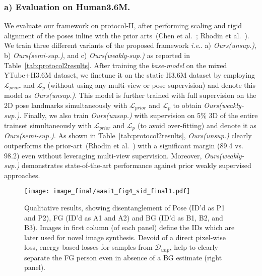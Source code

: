 \documentclass[letterpaper]{article} \usepackage{aaai20}  \usepackage{times}  \usepackage{helvet}  \usepackage{courier}  \usepackage{url}  \usepackage{graphicx}  \usepackage{amsmath}
\makeatletter
\DeclareRobustCommand\onedot{\futurelet\@let@token\@onedot}
\def\@onedot{\ifx\@let@token.\else.\null\fi\xspace}
\def\ie{\emph{i.e}\onedot} \def\Ie{\emph{I.e}\onedot}
\makeatother
\begin{document}
\subsubsection{a) Evaluation on Human3.6M.}
We evaluate our framework on protocol-II, after performing scaling and rigid alignment of the poses inline with the prior arts~({\color{coolblack}Chen et al.~\citeyear{chen2019unsupervised}}; {\color{coolblack}Rhodin et al.~\citeyear{rhodin2018unsupervised}}). We train three different variants of the proposed framework \ie a) \textit{Ours(unsup.)}, b) \textit{Ours(semi-sup.)}, and c) \textit{Ours(weakly-sup.)} as reported in Table~\ref{tab:protocol2results}. After training the \textit{base-model} on the mixed YTube+H3.6M dataset, we finetune it on the static H3.6M dataset by employing $\mathcal{L}_{prior}$ and $\mathcal{L}_{p}$ (without using any multi-view or pose supervision) and denote this model as \textit{Ours(unsup.)}. This model is further trained with full supervision on the 2D pose landmarks simultaneously with $\mathcal{L}_{prior}$ and $\mathcal{L}_{p}$ to obtain \textit{Ours(weakly-sup.)}. Finally, we also train \textit{Ours(unsup.)} with supervision on 5\% 3D of the entire trainset simultaneously with $\mathcal{L}_{prior}$ and $\mathcal{L}_{p}$ (to avoid over-fitting) and denote it as \textit{Ours(semi-sup.)}. As shown in Table~\ref{tab:protocol2results}, \textit{Ours(unsup.)} clearly outperforms the prior-art~({\color{coolblack}Rhodin et al.~\citeyear{rhodin2018unsupervised}}) with a significant margin (89.4 vs. 98.2) even without leveraging multi-view supervision. Moreover, \textit{Ours(weakly-sup.)} demonstrates state-of-the-art performance against prior weakly supervised approaches. 

\begin{figure*}[!tbhp]\begin{center}
	\texttt{[image: image\_final/aaai1\_fig4\_sid\_final1.pdf]}
	\vspace{-5.2mm}
	\caption{\small 
	Qualitative results, showing disentanglement of Pose (ID'd as P1 and P2), FG (ID'd as A1 and A2) and BG (ID'd as B1, B2, and B3). Images in first column (of each panel) define the IDs which are later used for novel image synthesis. Devoid of a direct pixel-wise loss, energy-based losses for samples from $\mathcal{D}_{unp}$, help to clearly separate the FG person even in absence of a BG estimate (right panel).
	}
    \vspace{-2mm}
    \label{fig:viewsyn}  
\end{center}
\end{figure*}
\end{document}

